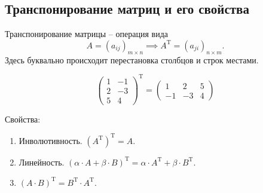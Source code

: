 \documentclass[12pt, a4paper]{article}
\begin{document}
    \subsection{Транспонирование матриц и его свойства}
    \begin{definition}
        Транспонирование матрицы -- операция вида \[
            A = (a_{ij})_{m\times n} \implies A^{\mathrm{T}} = (a_{ji})_{n\times m}.
        \] Здесь буквально происходит перестановка столбцов и строк местами.
    \end{definition}
    \begin{exmp}
        \[
            \begin{pmatrix} 1 & -1 \\ 2 & -3 \\ 5 & 4\end{pmatrix}^{\mathrm{T}}  = \begin{pmatrix} 1 & 2 & 5 \\ -1 & -3 & 4 \end{pmatrix} 
        \] 
    \end{exmp}
    Свойства: \begin{enumerate}
        \item Инволютивность. \( (A^{\mathrm{T}} )^{\mathrm{T}} = A  \).
        \item Линейность. \( (\alpha \cdot A + \beta \cdot B)^{\mathrm T} = \alpha \cdot A^{\mathrm T} + \beta \cdot B^{\mathrm T} \).
        \item \( (A \cdot B)^{\mathrm T} = B^{\mathrm T}   \cdot  A^{\mathrm T}   \).
    \end{enumerate}
\end{document}
